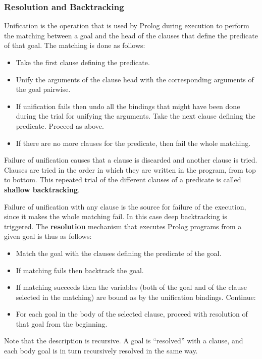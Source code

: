 \subsubsection{Resolution and Backtracking}

Unification is the operation that is used by Prolog during execution
to perform the matching between a goal and the head of the clauses
that define the predicate of that goal. The matching is done as
follows:
\begin{itemize}
\item Take the first clause defining the predicate.
\item Unify the arguments of the clause head with the corresponding
  arguments of the goal pairwise.
\item If unification fails then undo all the bindings that might have
  been done during the trial for unifying the arguments. Take the next
  clause defining the predicate. Proceed as above.
\item If there are no more clauses for the predicate, then fail the
  whole matching.
\end{itemize}

Failure of unification causes that a clause is discarded and another
clause is tried. Clauses are tried in the order in which they are
written in the program, from top to bottom. This repeated trial of the
different clauses of a predicate is called {\bf shallow backtracking}.

Failure of unification with any clause is the source for failure of
the execution, since it makes the whole matching fail. In this case
deep backtracking is triggered. The {\bf resolution} mechanism that
executes Prolog programs from a given goal is thus as follows:
\begin{itemize}
\item Match the goal with the clauses defining the predicate of the
  goal. 
\item If matching fails then backtrack the goal.
\item If matching succeeds then the variables (both of the goal
  and of the clause selected in the matching) are bound as by the
  unification bindings. Continue: 
\item For each goal in the body of the selected clause, proceed with
  resolution of that goal from the beginning.
\end{itemize}
%
Note that the description is recursive. A goal is ``resolved'' with a
clause, and each body goal is in turn recursively resolved in the same
way. 

